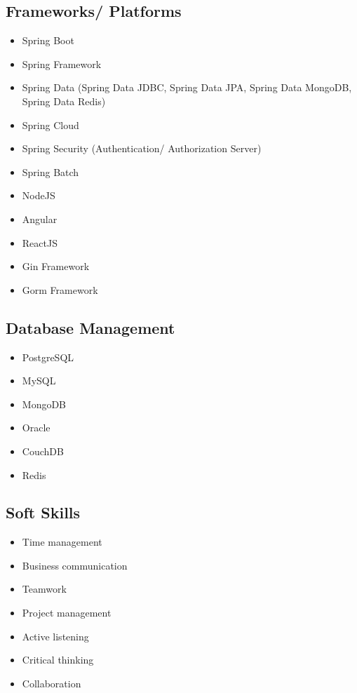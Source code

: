 \begin{cventries}
\begin{row}[cellsep=0.75cm]{3}{3}
\begin{cell}{1}
	\section*{Frameworks/ Platforms}
	\vspace{-1.5ex}
    \begin{itemize}
        \item {Spring Boot}
        \item {Spring Framework}
        \item {Spring Data (Spring Data JDBC, Spring Data JPA, Spring Data MongoDB, Spring Data Redis)}
        \item {Spring Cloud}
        \item {Spring Security (Authentication/ Authorization Server)}
        \item {Spring Batch}
        \item {NodeJS}
        \item {Angular}
        \item {ReactJS}
        \item {Gin Framework}
        \item {Gorm Framework}
    \end{itemize}
	\end{cell}
    \begin{cell}{1}
	\section*{Database Management}
	\vspace{-1.5ex}
    \begin{itemize}
        \item {PostgreSQL}
        \item {MySQL}
        \item {MongoDB}
        \item {Oracle}
        \item {CouchDB}
        \item {Redis}
    \end{itemize}
	\end{cell}
	\begin{cell}{1}
	\section*{Soft Skills}
	\vspace{-1.5ex}
    \begin{itemize}
        \item {Time management}
        \item {Business communication}
        \item {Teamwork}
        \item {Project management}
        \item {Active listening}
        \item {Critical thinking}
        \item {Collaboration}
    \end{itemize}
	\end{cell}
\end{row}


\end{cventries}
